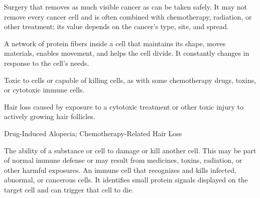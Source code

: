  Surgery that removes as much visible cancer as can be taken safely. It may not remove every cancer cell and is often combined with chemotherapy, radiation, or other treatment; its value depends on the cancer's type, site, and spread.

 A network of protein fibers inside a cell that maintains its shape, moves materials, enables movement, and helps the cell divide. It constantly changes in response to the cell's needs.

 Toxic to cells or capable of killing cells, as with some chemotherapy drugs, toxins, or cytotoxic immune cells.

 Hair loss caused by exposure to a cytotoxic treatment or other toxic injury to actively growing hair follicles.

\synonyms
Drug-Induced Alopecia; Chemotherapy-Related Hair Loss

 The ability of a substance or cell to damage or kill another cell. This may be part of normal immune defense or may result from medicines, toxins, radiation, or other harmful exposures.
 An immune cell that recognizes and kills infected, abnormal, or cancerous cells. It identifies small protein signals displayed on the target cell and can trigger that cell to die.
